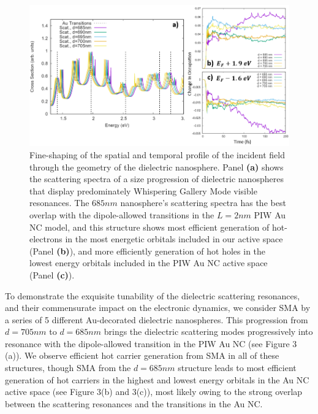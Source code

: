 \documentclass[journal=jpclcd,manuscript=article]{achemso}
\begin{document}
\begin{figure}
\begin{center}
\includegraphics[width=6in]{Au_WGM_Spectrum_and_Trajectories.png}
\caption{Fine-shaping of the spatial and temporal profile of the incident field
through the geometry of the dielectric nanosphere.  Panel {\bf (a)} shows
the scattering spectra of a size progression of dielectric nanospheres that display
predominately Whispering Gallery Mode visible resonances.  The
$685nm$ nanosphere's scattering spectra has the best overlap with the dipole-allowed
transitions in the $L=2nm$ PIW Au NC model, and this structure shows most efficient
generation of hot-electrons in the most energetic orbitals included in our
active space (Panel {\bf (b)}), and more efficiently generation of
hot holes in the lowest energy orbitals included in the PIW Au NC active space (Panel
{\bf (c)}).   }
\end{center}
\end{figure}

To demonstrate the exquisite tunability of the dielectric scattering resonances, and their 
commensurate impact on the electronic dynamics, we consider SMA by a series of 5 different Au-decorated dielectric
nanospheres.  This progression from $d=705 nm$ to $d=685 nm$ brings the dielectric scattering modes progressively 
into resonance with the dipole-allowed transition in the PIW Au NC (see Figure 3 (a)).  We observe efficient hot carrier
generation from SMA in all of these structures, though SMA from the $d=685 nm$ structure leads to most efficient generation
of hot carriers in the highest and lowest energy orbitals in the Au NC active space (see Figure 3(b) and 3(c)), 
most likely owing to the strong overlap between the scattering resonances and the transitions in the Au NC.
\end{document}
